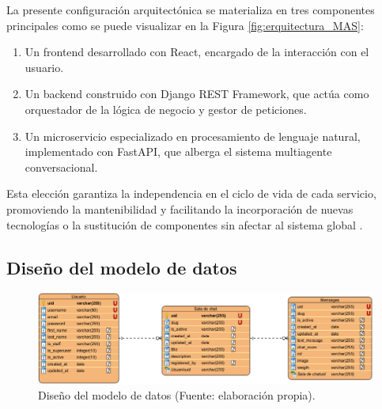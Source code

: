 La presente configuración arquitectónica se materializa en tres componentes principales como se puede visualizar en la Figura \ref{fig:erquitectura_MAS}:
  
\begin{enumerate}
	\item Un frontend desarrollado con React, encargado de la interacción con el usuario.  
	\item Un backend construido con Django REST Framework, que actúa como orquestador de la lógica de negocio y gestor de peticiones.  
	\item Un microservicio especializado en procesamiento de lenguaje natural, implementado con FastAPI, que alberga el sistema multiagente conversacional.  
\end{enumerate}

Esta elección garantiza la independencia en el ciclo de vida de cada servicio, promoviendo la mantenibilidad y facilitando la incorporación de nuevas tecnologías o la sustitución de componentes sin afectar al sistema global \cite{turn0search1,turn1search4}.

\subsection{Diseño del modelo de datos}

\begin{figure}[htbp] 
	\centering
	\includegraphics[width=1\textwidth]{images/modelo.png} 
	\caption{Diseño del modelo de datos (Fuente: elaboración propia).}
	\label{fig:modelo_de_datos}
\end{figure}


